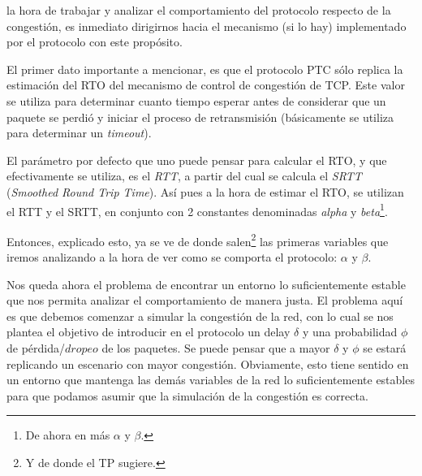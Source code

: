 la hora de trabajar y analizar el comportamiento del
protocolo respecto de la congesti\'on, es inmediato dirigirnos hacia el
mecanismo (si lo hay) implementado por el protocolo con este prop\'osito.

\par El primer dato importante a mencionar, es que el protocolo PTC s\'olo
replica la estimaci\'on del RTO del mecanismo de control de congesti\'on de
TCP\cite{rfc5681}.  Este valor se utiliza para determinar cuanto tiempo esperar
antes de considerar que un paquete se perdi\'o y iniciar el proceso de
retransmisi\'on (b\'asicamente se utiliza para determinar un \textit{timeout}).

\par El par\'ametro por defecto que uno puede pensar para calcular el RTO, y
que efectivamente se utiliza, es el
\textit{RTT}\cite{rfc1323}\cite{karns_algorithm}\cite{rfc6298}, a partir del
cual se calcula el \textit{SRTT} (\textit{Smoothed Round Trip
Time}\cite{rfc6298}). As\'i pues a la hora de estimar el RTO, se utilizan el
RTT y el SRTT, en conjunto con 2 constantes denominadas \emph{alpha} y
\emph{beta}\footnote{De ahora en m\'as $\alpha$ y $\beta$.}\cite{rfc6298}.

\par Entonces, explicado esto, ya se ve de donde salen\footnote{Y de donde el
TP sugiere.} las primeras variables que iremos analizando a la hora de ver como
se comporta el protocolo: $\alpha$ y $\beta$.

\par Nos queda ahora el problema de encontrar un entorno lo suficientemente
estable que nos permita analizar el comportamiento de manera justa. El problema
aqu\'i es que debemos comenzar a simular la congesti\'on de la red, con lo cual
se nos plantea el objetivo de introducir en el protocolo un delay $\delta$ y
una probabilidad $\phi$ de p\'erdida/$dropeo$ de los paquetes.  Se puede pensar
que a mayor $\delta$ y $\phi$ se estar\'a replicando un escenario con mayor
congesti\'on. Obviamente, esto tiene sentido en un entorno que mantenga las
dem\'as variables de la red lo suficientemente estables para que podamos asumir
que la simulaci\'on de la congesti\'on es correcta.

